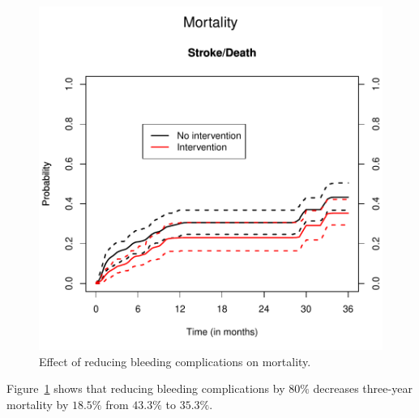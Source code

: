 \begin{figure}
\begin{center}
\includegraphics{PDF/Application-InterPlot}
\end{center}
\caption{Effect of reducing bleeding complications on mortality.}
\label{fig:InterPlot}
\end{figure}


Figure~\ref{fig:InterPlot} shows that reducing bleeding complications by $80\%$ decreases three-year mortality by $18.5\%$ from $43.3\%$ to $35.3\%$.
